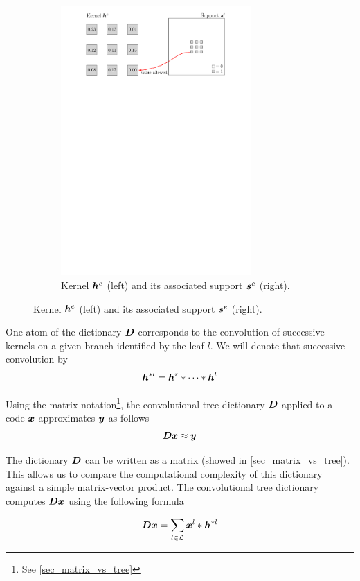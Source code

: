 \begin{figure}[!ht]
\begin{subfigure}[b]{0.79\textwidth}
\includegraphics[width=0.80\textwidth]{figures/kernel-h_e.pdf}
\caption{Kernel $\bm{h}^e$ (left) and its associated support $\bm{s}^e$ (right).}\label{fig_example_kernel}
\end{subfigure}
\end{figure}

One atom of the dictionary $\bm{D}$ corresponds to the convolution of successive kernels on a given branch identified by the leaf $l$. We will denote that successive convolution by
$$\bm{h}^{*l} = \bm{h}^r * \dots * \bm{h}^l$$

Using the matrix notation\footnote{See \cref{sec_matrix_vs_tree}}, the convolutional tree dictionary $\bm{D}$ applied to a code $\bm{x}$ approximates $\bm{y}$ as follows
$$\bm{D}\bm{x} \approx \bm{y}$$

The dictionary $\bm{D}$ can be written as a matrix (showed in \cref{sec_matrix_vs_tree}). This allows us to compare the computational complexity of this dictionary against a simple matrix-vector product. The convolutional tree dictionary computes $\bm{D}\bm{x}$ using the following formula

\begin{align}
	\bm{D}\bm{x} = \sum_{l \in \mathcal L} \bm{x}^l * \bm{h}^{*l} \label{eq_Dx_as_convolution}
\end{align}

